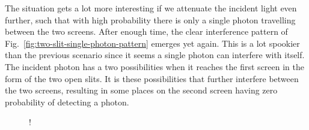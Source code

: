 The situation gets a lot more interesting if we attenuate the incident light even further, such that with high probability there is only a single photon travelling between the two screens.
After enough time, the clear interference pattern of Fig.~\ref{fig:two-slit-single-photon-pattern} emerges yet again.
This is a lot spookier than the previous scenario since it seems a single photon can interfere with itself.
The incident photon has a two possibilities when it reaches the first screen in the form of the two open slits.
It is these possibilities that further interfere between the two screens, resulting in some places on the second screen having zero probability of detecting a photon.

\begin{figure}[t]
    \centering
    \resizebox {0.95\textwidth} {!} {
    }
\end{figure}
